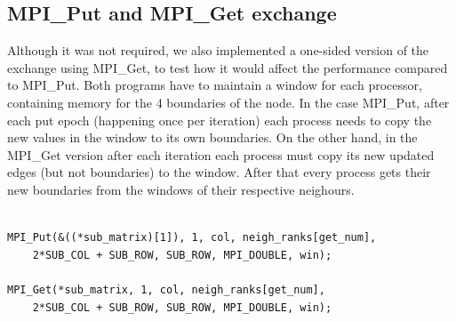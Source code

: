 \documentclass[11pt]{article}
\begin{document}
\subsection{MPI\_Put and MPI\_Get exchange}
Although it was not required, we also implemented a one-sided version of the exchange using MPI\_Get, to test how it would affect the performance 
compared to MPI\_Put. Both programs have to maintain a window for each processor, containing memory for the 4 boundaries of the node. In the case
MPI\_Put, after each put epoch (happening once per iteration) each process needs to copy the new values in the window to its own boundaries. On the
other hand, in the MPI\_Get version after each iteration each process must copy its new updated edges (but not boundaries) to the window. After that
every process gets their new boundaries from the windows of their respective neighours.
\begin{lstlisting}[label=some-code, caption=Left MPI\_Put vs left MPI\_Get call]
      
MPI_Put(&((*sub_matrix)[1]), 1, col, neigh_ranks[get_num], 
    2*SUB_COL + SUB_ROW, SUB_ROW, MPI_DOUBLE, win);

MPI_Get(*sub_matrix, 1, col, neigh_ranks[get_num], 
    2*SUB_COL + SUB_ROW, SUB_ROW, MPI_DOUBLE, win);

\end{lstlisting}
\end{document}
